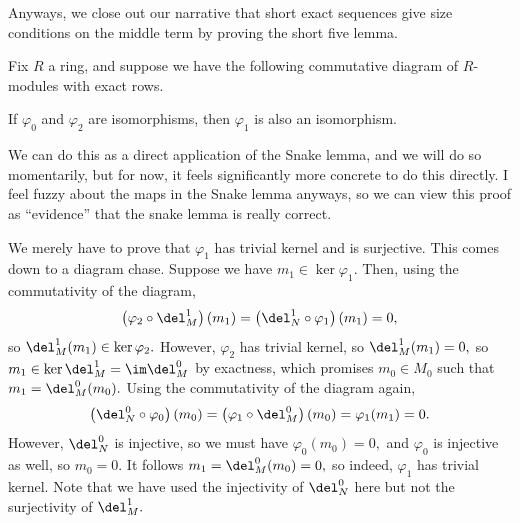 Anyways, we close out our narrative that short exact sequences give size conditions on the middle term by proving the short five lemma.
\begin{proposition}
    Fix $R$ a ring, and suppose we have the following commutative diagram of $R$-modules with exact rows.
    \begin{center}
    \end{center}
    If $\varphi_0$ and $\varphi_2$ are isomorphisms, then $\varphi_1$ is also an isomorphism.
\end{proposition}
We can do this as a direct application of the Snake lemma, and we will do so momentarily, but for now, it feels significantly more concrete to do this directly. I feel fuzzy about the maps in the Snake lemma anyways, so we can view this proof as ``evidence'' that the snake lemma is really correct.

We merely have to prove that $\varphi_1$ has trivial kernel and is surjective. This comes down to a diagram chase. Suppose we have $m_1\in\ker\varphi_1.$ Then, using the commutativity of the diagram,
\[\left(\varphi_2\circ\del_M^1\right)(m_1)=\left(\del_N^1\circ\varphi_1\right)(m_1)=0,\]
so $\del_M^1(m_1)\in\ker\varphi_2.$ However, $\varphi_2$ has trivial kernel, so $\del_M^1(m_1)=0,$ so $m_1\in\ker\del_M^1=\im\del_M^0$ by exactness, which promises $m_0\in M_0$ such that $m_1=\del_M^0(m_0).$ Using the commutativity of the diagram again,
\[\left(\del_N^0\circ\varphi_0\right)(m_0)=\left(\varphi_1\circ\del_M^0\right)(m_0)=\varphi_1(m_1)=0.\]
However, $\del_N^0$ is injective, so we must have $\varphi_0(m_0)=0,$ and $\varphi_0$ is injective as well, so $m_0=0.$ It follows $m_1=\del_M^0(m_0)=0,$ so indeed, $\varphi_1$ has trivial kernel. Note that we have used the injectivity of $\del_N^0$ here but not the surjectivity of $\del_M^1.$

